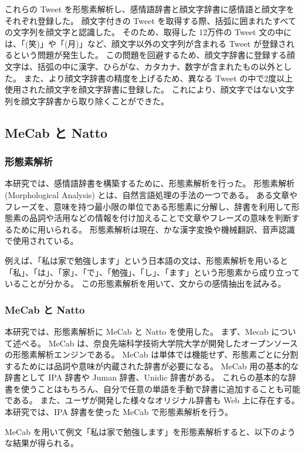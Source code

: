 \documentclass[11pt,a4j]{jsarticle}
\begin{document}
これらの Tweet を形態素解析し、感情語辞書と顔文字辞書に感情語と顔文字をそれぞれ登録した。
顔文字付きの Tweet を取得する際、括弧に囲まれたすべての文字列を顔文字と認識した。
そのため、取得した 12万件の Tweet 文の中には、「(笑)」や「(月)」など、顔文字以外の文字列が含まれる Tweet が登録されるという問題が発生した。
この問題を回避するため、顔文字辞書に登録する顔文字は、括弧の中に漢字、ひらがな、カタカナ、数字が含まれたもの以外とした。
また、より顔文字辞書の精度を上げるため、異なる Tweet の中で2度以上使用された顔文字を顔文字辞書に登録した。
これにより、顔文字ではない文字列を顔文字辞書から取り除くことができた。


\subsection{MeCab と Natto}
\subsubsection{形態素解析}
本研究では、感情語辞書を構築するために、形態素解析を行った。
形態素解析 (Morphological Analysis) とは、自然言語処理の手法の一つである。
ある文章やフレーズを、意味を持つ最小限の単位である形態素に分解し、辞書を利用して形態素の品詞や活用などの情報を付け加えることで文章やフレーズの意味を判断するために用いられる。
形態素解析は現在、かな漢字変換や機械翻訳、音声認識で使用されている。

例えば、「私は家で勉強します」という日本語の文は、形態素解析を用いると「私」、「は」、「家」、「で」、「勉強」、「し」、「ます」という形態素から成り立っていることが分かる。
この形態素解析を用いて、文からの感情抽出を試みる。

\subsubsection{MeCab と Natto}
本研究では、形態素解析に MeCab と Natto を使用した。
まず、Mecab について述べる。
MeCab  は、奈良先端科学技術大学院大学が開発したオープンソースの形態素解析エンジンである。
MeCab は単体では機能せず、形態素ごとに分割するためには品詞や意味が内蔵された辞書が必要になる。
MeCab 用の基本的な辞書として IPA 辞書や Juman 辞書、Unidic 辞書がある。
これらの基本的な辞書を使うことはもちろん、自分で任意の単語を手動で辞書に追加することも可能である。
また、ユーザが開発した様々なオリジナル辞書も Web 上に存在する。
本研究では、IPA 辞書を使った MeCab で形態素解析を行う。

MeCab を用いて例文「私は家で勉強します」を形態素解析すると、以下のような結果が得られる。
\end{document}
